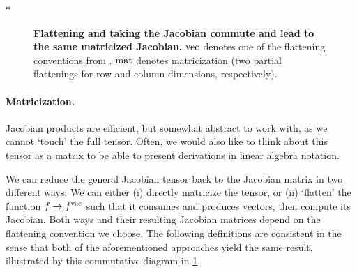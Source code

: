 \switchcolumn[1]*
\begin{figure}[!h]
  \centering
  \caption{\textbf{Flattening and taking the Jacobian commute and lead to the same matricized Jacobian.}
    $\vec$ denotes one of the flattening conventions from .
    $\mat$ denotes matricization (two partial flattenings for row and column dimensions, respectively).}\label{fig:commutative-diagram-jacobian}
\end{figure}
\switchcolumn[0]

\paragraph{Matricization.}
Jacobian products are efficient, but somewhat abstract to work with, as we cannot `touch' the full tensor.
Often, we would also like to think about this tensor as a matrix to be able to present derivations in linear algebra notation.

We can reduce the general Jacobian tensor back to the Jacobian matrix in two different ways: We can either (i) directly matricize the tensor, or (ii) `flatten' the function $f \to f^{\vec}$ such that it consumes and produces vectors, then compute its Jacobian.
Both ways and their resulting Jacobian matrices depend on the flattening convention we choose.
The following definitions are consistent in the sense that both of the aforementioned approaches yield the same result, illustrated by this commutative diagram in \cref{fig:commutative-diagram-jacobian}.


